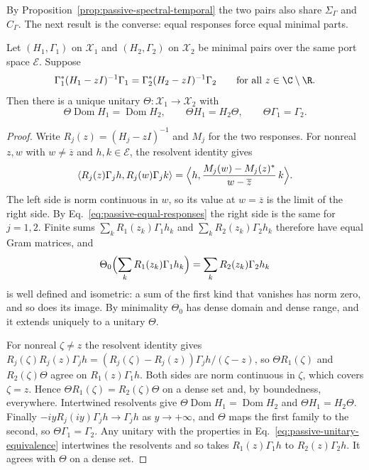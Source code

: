 By Proposition~\ref{prop:passive-spectral-temporal} the two pairs also share $\Sigma_\Gamma$ and $C_\Gamma$. The next result is the converse: equal responses force equal minimal parts.

\begin{proposition}
\label{prop:passive-uniqueness}
Let $(H_1,\Gamma_1)$ on $\mathcal X_1$ and $(H_2,\Gamma_2)$ on $\mathcal X_2$ be minimal pairs over the same port space $\mathcal E$. Suppose
\begin{equation}
 \Gamma_1^*(H_1-zI)^{-1}\Gamma_1=\Gamma_2^*(H_2-zI)^{-1}\Gamma_2
 \qquad\text{for all }z\in\C\setminus\R .
 \label{eq:passive-equal-responses}
\end{equation}
Then there is a unique unitary $\Theta:\mathcal X_1\to\mathcal X_2$ with
\begin{equation}
 \Theta\operatorname{Dom}H_1=\operatorname{Dom}H_2,\qquad \Theta H_1=H_2\Theta,\qquad \Theta\Gamma_1=\Gamma_2 .
 \label{eq:passive-unitary-equivalence}
\end{equation}
\end{proposition}
\begin{proof}
Write $R_j(z)=(H_j-zI)^{-1}$ and $M_j$ for the two responses. For nonreal $z,w$ with $w\ne\overline z$ and $h,k\in\mathcal E$, the resolvent identity gives
\begin{equation}
 \langle R_j(z)\Gamma_jh,R_j(w)\Gamma_jk\rangle
   =\Bigl\langle h,\frac{M_j(w)-M_j(z)^*}{w-\overline z}\,k\Bigr\rangle .
 \label{eq:passive-gram}
\end{equation}
The left side is norm continuous in $w$, so its value at $w=\overline z$ is the limit of the right side. By Eq.~\eqref{eq:passive-equal-responses} the right side is the same for $j=1,2$. Finite sums $\sum_kR_1(z_k)\Gamma_1h_k$ and $\sum_kR_2(z_k)\Gamma_2h_k$ therefore have equal Gram matrices, and
\[
 \Theta_0\Bigl(\sum_kR_1(z_k)\Gamma_1h_k\Bigr)=\sum_kR_2(z_k)\Gamma_2h_k
\]
is well defined and isometric: a sum of the first kind that vanishes has norm zero, and so does its image. By minimality $\Theta_0$ has dense domain and dense range, and it extends uniquely to a unitary $\Theta$.

For nonreal $\zeta\ne z$ the resolvent identity gives $R_j(\zeta)R_j(z)\Gamma_jh=(R_j(\zeta)-R_j(z))\Gamma_jh/(\zeta-z)$, so $\Theta R_1(\zeta)$ and $R_2(\zeta)\Theta$ agree on $R_1(z)\Gamma_1h$. Both sides are norm continuous in $\zeta$, which covers $\zeta=z$. Hence $\Theta R_1(\zeta)=R_2(\zeta)\Theta$ on a dense set and, by boundedness, everywhere. Intertwined resolvents give $\Theta\operatorname{Dom}H_1=\operatorname{Dom}H_2$ and $\Theta H_1=H_2\Theta$. Finally $-iyR_j(iy)\Gamma_jh\to\Gamma_jh$ as $y\to+\infty$, and $\Theta$ maps the first family to the second, so $\Theta\Gamma_1=\Gamma_2$. Any unitary with the properties in Eq.~\eqref{eq:passive-unitary-equivalence} intertwines the resolvents and so takes $R_1(z)\Gamma_1h$ to $R_2(z)\Gamma_2h$. It agrees with $\Theta$ on a dense set.
\end{proof}

